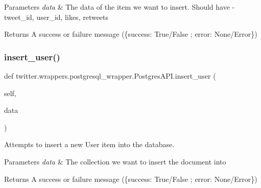 \begin{DoxyParams}{Parameters}
{\em data} & The data of the item we want to insert. Should have -\/ tweet\+\_\+id, user\+\_\+id, likes, retweets \\
\hline
\end{DoxyParams}
\begin{DoxyReturn}{Returns}
A success or failure message (\{success\+: True/\+False ; error\+: None/\+Error\}) 
\end{DoxyReturn}
\mbox{\label{classtwitter_1_1wrappers_1_1postgresql__wrapper_1_1PostgresAPI_ae94da23c6824c6db14d62624eee98325}} 
\subsubsection{\texorpdfstring{insert\+\_\+user()}{insert\_user()}}
{\footnotesize\ttfamily def twitter.\+wrappers.\+postgresql\+\_\+wrapper.\+Postgres\+A\+P\+I.\+insert\+\_\+user (\begin{DoxyParamCaption}\item[{}]{self,  }\item[{}]{data }\end{DoxyParamCaption})}



Attempts to insert a new User item into the database. 


\begin{DoxyParams}{Parameters}
{\em data} & The collection we want to insert the document into \\
\hline
\end{DoxyParams}
\begin{DoxyReturn}{Returns}
A success or failure message (\{success\+: True/\+False ; error\+: None/\+Error\}) 
\end{DoxyReturn}
\mbox{\label{classtwitter_1_1wrappers_1_1postgresql__wrapper_1_1PostgresAPI_a85bdfe473c1bd0bd29e11c059e7cb3dc}} 
